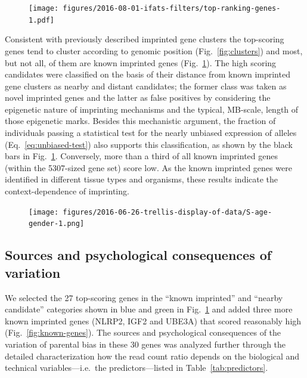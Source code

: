 \documentclass[letterpaper]{article}
\begin{document}
\begin{figure}
\begin{center}
\texttt{[image: figures/2016-08-01-ifats-filters/top-ranking-genes-1.pdf]}
\caption{}
\label{fig:top-genes}
\end{center}
\end{figure}

Consistent with previously described imprinted gene clusters the top-scoring
genes tend to cluster according to genomic position (Fig.~\ref{fig:clusters})
and most, but not all, of them are known imprinted genes
(Fig.~\ref{fig:top-genes}).  The high scoring candidates were classified on
the basis of their distance from known imprinted gene clusters as nearby and
distant candidates; the former class was taken as novel imprinted genes and
the latter as false positives by considering the epigenetic nature of
imprinting mechanisms and the typical, MB-scale, length of those epigenetic
marks.  Besides this mechanistic argument, the fraction of individuals passing
a statistical test for the nearly unbiased expression of alleles
(Eq.~\ref{eq:unbiased-test}) also supports this classification, as shown by
the black bars in Fig.~\ref{fig:top-genes}. Conversely, more than a third of
all known imprinted genes (within the 5307-sized gene set) score low.  As the
known imprinted genes were identified in different tissue types and organisms,
these results indicate the context-dependence of imprinting.

\begin{figure}
\begin{center}
\texttt{[image: figures/2016-06-26-trellis-display-of-data/S-age-gender-1.png]}
\caption{}
\label{fig:S-age-gender}
\end{center}
\end{figure}

\subsection{Sources and psychological consequences of variation}
\label{sec:results-regression}

We selected the 27 top-scoring genes in the ``known imprinted'' and ``nearby
candidate'' categories shown in blue and green in Fig.~\ref{fig:top-genes} and
added three more known imprinted genes (NLRP2, IGF2 and UBE3A) that scored
reasonably high (Fig.~\ref{fig:known-genes}).  The sources and psychological
consequences of the variation of parental bias in these 30 genes was analyzed
further through the detailed characterization how the read count ratio depends
on the biological and technical variables---i.e.~the predictors---listed in Table~\ref{tab:predictors}.
\end{document}
